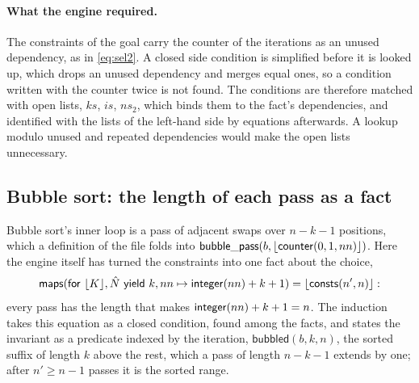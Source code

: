 \paragraph{What the engine required.} The constraints of the goal carry the counter of the iterations as an unused
dependency, as in \eqref{eq:sel2}. A closed side condition is simplified
before it is looked up, which drops an unused dependency and merges equal ones, so a condition written with the
counter twice is not found. The conditions are therefore matched with open lists, $ks$, $is$, $ns_2$, which binds them
to the fact's dependencies, and identified with the lists of the left-hand side by equations afterwards. A lookup
modulo unused and repeated dependencies would make the open lists unnecessary.

\subsection{Bubble sort: the length of each pass as a fact}\label{sec:sorts:bubble}
Bubble sort's inner loop is a pass of adjacent swaps over $n - k - 1$ positions, which a definition of the file folds
into $\mathsf{bubble\_pass}(b, \lfloor \mathsf{counter}(0, 1, nn)\rfloor)$. Here the engine itself has turned the constraints into one fact
about the choice,
\[ \mathsf{maps}(\mathsf{for}\ \lfloor K\rfloor, \hat{N}\ \mathsf{yield}\ k, nn \mapsto \mathsf{integer}(nn) + k + 1) = \lfloor \mathsf{consts}(n', n)\rfloor: \]
every pass has the length that makes $\mathsf{integer}(nn) + k + 1 = n$. The induction takes this equation as a closed condition, found among the facts, and
states the invariant as a predicate indexed by the iteration, $\mathsf{bubbled}(b, k, n)$, the sorted suffix of length $k$
above the rest, which a pass of length $n - k - 1$ extends by one; after $n' \ge n - 1$ passes it is the sorted range.

